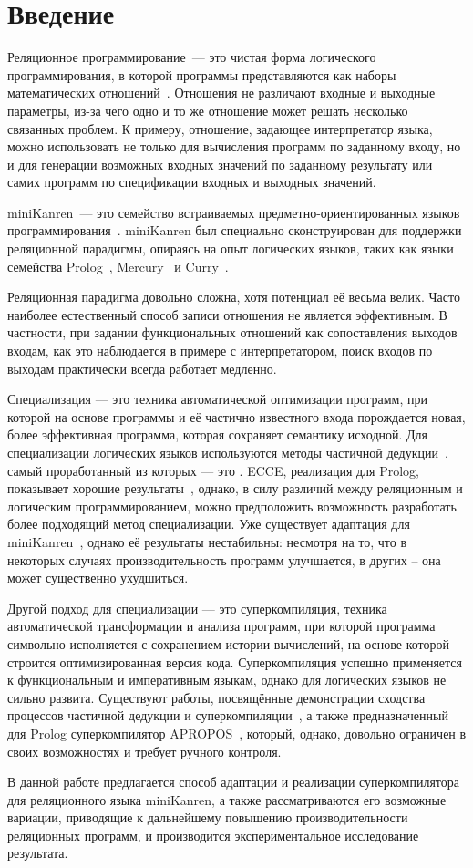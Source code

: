 \section*{Введение}

Реляционное программирование~--- это чистая форма логического программирования,
в которой программы представляются как наборы математических отношений~\cite{byrdMK}.
Отношения
не различают входные и выходные параметры, из-за чего одно и то же
отношение может решать несколько связанных проблем. К примеру, отношение, задающее
интерпретатор языка, можно использовать не только для вычисления программ по
заданному входу, но и для генерации возможных входных значений по заданному результату
или самих программ по спецификации входных и выходных значений.

miniKanren~--- это семейство встраиваемых предметно-ориентированных языков программирования~\cite{byrdMK}.
miniKanren был специально сконструирован для поддержки реляционной парадигмы,
опираясь на опыт логических языков, таких как языки семейства Prolog~\cite{logicMJ},
Mercury~\cite{mercury} и Curry~\cite{curry}.

Реляционная парадигма довольно сложна, хотя потенциал её весьма велик.
Часто наиболее естественный способ записи отношения не является эффективным. В
частности, при задании функциональных отношений как сопоставления выходов
входам, как это наблюдается в примере с интерпретатором, поиск входов по выходам практически
всегда работает медленно.

Специализация --- это техника автоматической оптимизации программ,
при которой на основе программы и её частично известного входа
порождается новая, более эффективная программа, которая сохраняет семантику
исходной. Для специализации логических языков используются методы частичной дедукции~\cite{advanced},
самый проработанный из которых --- это \cpd\cite{cpd}. ECCE, реализация \forcpd для Prolog, показывает
хорошие результаты~\cite{controlPoly},
однако, в силу различий между реляционным и логическим программированием, можно предположить возможность разработать более подходящий
метод специализации. Уже существует адаптация \forcpd для miniKanren~\cite{lozov},
однако её результаты нестабильны: несмотря на то, что в некоторых случаях
производительность программ улучшается, в других -- она может существенно ухудшиться.

Другой подход для специализации --- это суперкомпиляция,
техника автоматической трансформации и анализа программ,
при которой программа символьно исполняется с сохранением истории вычислений,
на основе которой строится оптимизированная версия кода.
Суперкомпиляция успешно применяется к функциональным и императивным языкам,
однако для логических языков не сильно развита. Существуют
работы, посвящённые демонстрации сходства процессов частичной дедукции и суперкомпиляции~\cite{pdAndDriving},
а также предназначенный для Prolog суперкомпилятор APROPOS~\cite{apropos}, который, однако, довольно ограничен
в своих возможностях и требует ручного контроля.

В данной работе предлагается способ адаптации и реализации суперкомпилятора для
реляционного языка miniKanren, а также рассматриваются его возможные вариации, приводящие к
дальнейшему повышению производительности реляционных программ, и производится экспериментальное
исследование результата.

